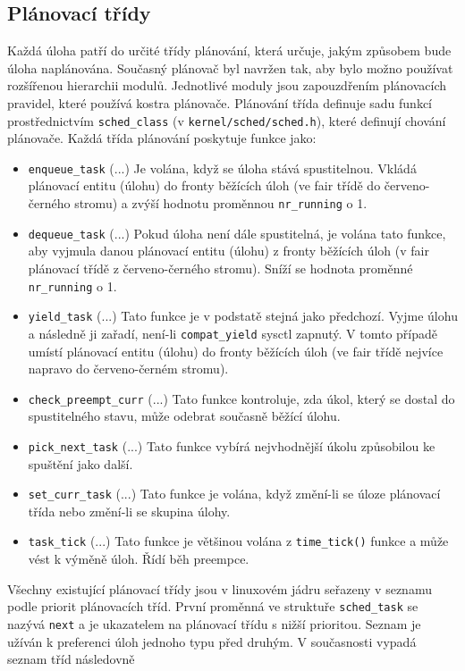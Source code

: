 \documentclass[a4paper,12pt]{article}
\begin{document}
\subsection{Plánovací třídy}
Každá úloha patří do určité třídy plánování, která určuje, jakým způsobem bude úloha naplánována. 
Současný plánovač byl navržen tak, aby bylo možno používat rozšířenou hierarchii modulů. Jednotlivé moduly jsou zapouzdřením plánovacích pravidel, které používá kostra plánovače. 
Plánování třída definuje sadu funkcí prostřednictvím \verb#sched_class# (v \verb#kernel/sched/sched.h#), které definují chování plánovače. 
\newpage
Každá třída plánování poskytuje funkce jako:
\begin{itemize}
\item \verb#enqueue_task# (...) 
Je volána, když se úloha stává spustitelnou. Vkládá plánovací entitu (úlohu) do fronty běžících úloh (ve fair třídě do červeno-černého stromu) a zvýší hodnotu proměnnou \verb#nr_running# o 1.
\item \verb#dequeue_task# (...) 
Pokud úloha není dále spustitelná, je volána tato funkce, aby vyjmula danou plánovací entitu (úlohu) z fronty běžících úloh (v fair plánovací třídě z červeno-černého stromu). Sníží se hodnota proměnné \verb#nr_running# o 1.
\item \verb#yield_task# (...) 
Tato funkce je v podstatě stejná jako předchozí. Vyjme úlohu a následně ji zařadí, není-li \verb#compat_yield# sysctl zapnutý. V tomto případě umístí plánovací entitu (úlohu) do fronty běžících úloh (ve fair třídě nejvíce napravo do červeno-černém stromu).
\item \verb#check_preempt_curr# (...) 
Tato funkce kontroluje, zda úkol, který se dostal do spustitelného stavu, může odebrat současně běžící úlohu.
\item \verb#pick_next_task# (...) 
Tato funkce vybírá nejvhodnější úkolu způsobilou ke spuštění jako další.
\item \verb#set_curr_task# (...) 
Tato funkce je volána, když změní-li se úloze plánovací třída nebo změní-li se skupina úlohy.
\item \verb#task_tick# (...) 
Tato funkce je většinou volána z \verb#time_tick()# funkce a může vést k výměně úloh. Řídí běh preempce. 
\end{itemize}

Všechny existující plánovací třídy jsou v linuxovém jádru seřazeny v seznamu podle priorit plánovacích tříd. První proměnná ve struktuře \verb#sched_task# se nazývá \verb#next# a je ukazatelem na plánovací třídu s nižší prioritou. Seznam je užíván k preferenci úloh jednoho typu před druhým. V současnosti vypadá seznam tříd následovně
\end{document}
